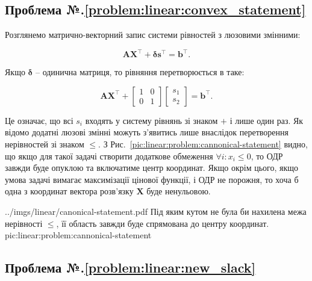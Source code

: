 \documentclass[\main/book.tex]{subfiles}
\begin{document}
\subsection*{Проблема №.\ref{problem:linear:convex_statement}}

Розглянемо матрично-векторний запис системи рівностей з люзовими змінними:

\[
 \mathbf{A} \mathbf{X}^\top + \mathbf{\delta} \mathbf{s}^\top = \mathbf{b}^\top\text{.}
\]

Якщо $\mathbf{\delta}$ -- одинична матриця, то рівняння перетворюється в таке:


\[
 \mathbf{A} \mathbf{X}^\top +
 \left[
  \begin{array}{cc}
   1 & 0 \\
   0 & 1
  \end{array}
 \right]
 \left[
  \begin{array}{c}
   s_1 \\
   s_2
  \end{array}
 \right] = \mathbf{b}^\top\text{.}
\]

Це означає, що всі $s_i$ входять у систему рівнянь зі знаком \flqq{}$+$\frqq{} і лише один раз. Як відомо додатні люзові змінні можуть з'явитись лише внаслідок перетворення нерівностей зі знаком \flqq{}$\leq$\frqq{}. З Рис.~\ref{pic:linear:problem:cannonical-statement} видно, що якщо для такої задачі створити додаткове обмеження $\forall i: x_i \leq 0$, то ОДР завжди буде опуклою та включатиме центр координат. Якщо окрім цього, якщо умова задачі вимагає максимізації цінової функції, і ОДР не порожня, то хоча б одна з координат вектора розв'язку $\mathbf{X}$ буде ненульовою.

\illustration
 {../imgs/linear/canonical-statement.pdf}
 {Під яким кутом не була би нахилена межа нерівності \flqq{}$\leq$\frqq{}, її область завжди буде спрямована до центру координат.}
 {pic:linear:problem:cannonical-statement}

\subsection*{Проблема №.\ref{problem:linear:new_slack}}
\end{document}
